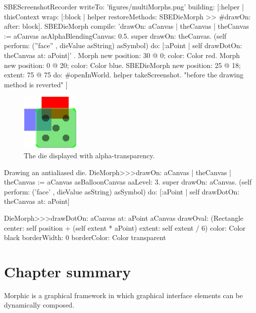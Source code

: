 \documentclass[a4paper,10pt,twoside]{book}
\begin{document}
\begin{ExecuteSmalltalkScript}
SBEScreenshotRecorder writeTo: 'figures/multiMorphs.png' building: [:helper |
	thisContext wrap: [:block | helper restoreMethods: {SBEDieMorph >> #drawOn:} after: block].
	SBEDieMorph compile: 'drawOn: aCanvas
	| theCanvas |
	theCanvas := aCanvas asAlphaBlendingCanvas: 0.5.
	super drawOn: theCanvas.
	(self perform: (''face'' , dieValue asString) asSymbol)
		do: [:aPoint | self drawDotOn: theCanvas at: aPoint]'
	.
	{ Morph new
		position: 30 @ 0;
		color: Color red.
	Morph new
		position: 0 @ 20;
		color: Color blue.
	SBEDieMorph new
		position: 25 @ 18;
		extent: 75 @ 75 } do: #openInWorld.
	helper takeScreenshot. "before the drawing method is reverted"
]
\end{ExecuteSmalltalkScript}
\begin{figure}[ht]
	\centerline{\includegraphics[scale=0.7]{multiMorphs}}
	\caption{The die displayed with alpha-transparency.
		\label{fig:multiMorphs}}
\end{figure}

\begin{methods}[aadie]{Drawing an antialiased die.}
DieMorph>>>drawOn: aCanvas
	| theCanvas |
	theCanvas := aCanvas asBalloonCanvas aaLevel: 3.
	super drawOn: aCanvas.
	(self perform: ('face' , dieValue asString) asSymbol)
		do: [:aPoint | self drawDotOn: theCanvas at: aPoint]

DieMorph>>>drawDotOn: aCanvas at: aPoint
	aCanvas
		drawOval: (Rectangle
			center: self position + (self extent * aPoint)
			extent: self extent / 6)
		color: Color black
		borderWidth: 0
		borderColor: Color transparent
\end{methods}

\section{Chapter summary}

Morphic is a graphical framework in which graphical interface elements can be dynamically composed.
\end{document}
